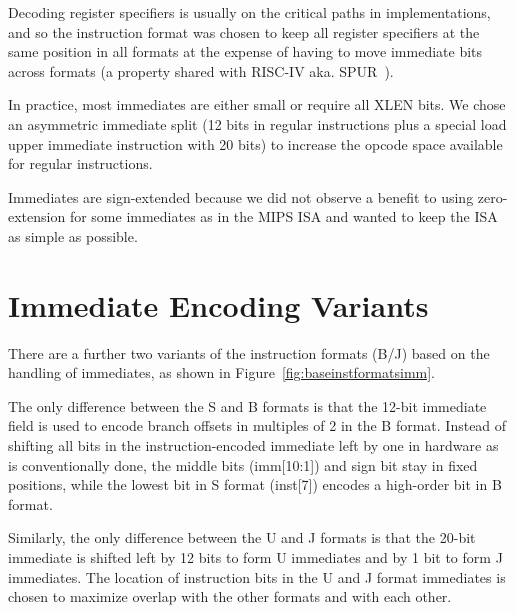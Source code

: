 \begin{commentary}
Decoding register specifiers is usually on the critical paths in
implementations, and so the instruction format was chosen to keep all
register specifiers at the same position in all formats at the expense
of having to move immediate bits across formats (a property shared
with RISC-IV aka. SPUR~\cite{spur-jsscc1989}).

In practice, most immediates are either small or require all XLEN
bits.  We chose an asymmetric immediate split (12 bits in regular
instructions plus a special load upper immediate instruction with 20
bits) to increase the opcode space available for regular instructions.

Immediates are sign-extended because we did not observe a benefit to
using zero-extension for some immediates as in the MIPS ISA and wanted
to keep the ISA as simple as possible.
\end{commentary}

\section{Immediate Encoding Variants}

There are a further two variants of the instruction formats (B/J)
based on the handling of immediates, as shown in
Figure~\ref{fig:baseinstformatsimm}.

The only difference between the S and B formats is that the 12-bit
immediate field is used to encode branch offsets in multiples of 2 in
the B format.  Instead of shifting all bits in the
instruction-encoded immediate left by one in hardware as is
conventionally done, the middle bits (imm[10:1]) and sign bit stay in
fixed positions, while the lowest bit in S format (inst[7]) encodes a
high-order bit in B format.

Similarly, the only difference between the U and J formats is
that the 20-bit immediate is shifted left by 12 bits to form U
immediates and by 1 bit to form J immediates.  The location of
instruction bits in the U and J format immediates is chosen to
maximize overlap with the other formats and with each other.

